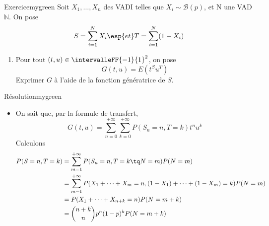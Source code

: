     \begin{omed}{Exercice}{mygreen}
        Soit $X_1,\ldots,X_n$ des VADI telles que $X_i \sim \mathcal{B}(p)$, et N une VAD$\mathbb{N}$. On pose 
        \[ S = \sum_{i=1}^{N} X_i \esp{et} T = \sum_{i=1}^{N} (1 - X_i) \]   
        \begin{enumerate}[label = (\alph*)]
            \item Pour tout $(t,u) \in \intervalleFF{-1}{1}^2$, on pose 
            \[ G(t,u) = E(t^S u^T) \]   
            Exprimer $G$ à l’aide de la fonction génératrice de $S$.
        \end{enumerate}
    \end{omed}

    \begin{demo}{Résolution}{mygreen}
        \begin{itemize}[label = (\alph*)]
            \item On sait que, par la formule de transfert, 
            \[ G(t,u) = \sum_{n=0}^{+\infty} \sum_{k=0}^{+\infty} P(S_n = n, T = k) t^n u^k \]   
            Calculons
            \begin{align*}
                P(S = n, T = k) 
                &= \sum_{m=1}^{+\infty} P(S_n = n, T = k \tq N = m) P(N = m) \\
                &= \sum_{m=1}^{+\infty} P(X_1 + \cdots + X_m = n, (1- X_1) + \cdots + (1 - X_m) = k) P(N = m) \\
                &= P(X_1 + \cdots + X_{n + k} = n) P(N = m + k) \\
                &= \binom{n+k}{n} p^n (1 - p)^k P(N = m + k)
            \end{align*} 
        \end{itemize}
    \end{demo}
















